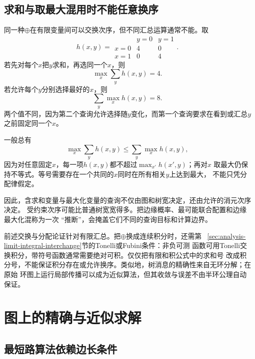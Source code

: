 \subsection{求和与取最大混用时不能任意换序}

同一种\(\oplus\)在有限变量间可以交换次序，但不同汇总运算通常不能。取
\[
  h(x,y)=
  \begin{array}{c|cc}
    &y=0&y=1\\ \hline
    x=0&4&0\\
    x=1&0&4
  \end{array}.
\]
若先对每个\(x\)把\(y\)求和，再选同一个\(x\)，则
\begin{equation}
  \max_x\sum_y h(x,y)=4.
  \label{eq:graph-theory-max-sum-order-a}
\end{equation}
若允许每个\(y\)分别选择最好的\(x\)，则
\begin{equation}
  \sum_y\max_x h(x,y)=8.
  \label{eq:graph-theory-max-sum-order-b}
\end{equation}
两个值不同，因为第二个查询允许选择随\(y\)变化，而第一个查询要求在看到或汇总\(y\)
之前固定同一个\(x\)。

一般总有
\[
  \max_x\sum_y h(x,y)\leq\sum_y\max_x h(x,y),
\]
因为对任意固定\(x\)，每一项\(h(x,y)\)都不超过\(\max_{x'}h(x',y)\)；再对\(x\)
取最大仍保持不等式。等号需要存在一个共同的\(x\)同时在所有相关\(y\)上达到最大，
不能只凭分配律假定。

因此，含求和变量与最大化变量的查询不仅由图和树宽决定，还由允许的消元次序决定。
受约束次序可能比普通树宽宽得多。把边缘概率、最可能联合配置和边缘最大化混称为一次
“推断”，会掩盖它们不同的查询目标和计算边界。

前述交换与分配论证针对有限汇总。把\(\oplus\)换成连续积分时，还需第
~\ref{sec:analysis-limit-integral-interchange}节的Tonelli或Fubini条件：非负可测
函数可用Tonelli交换积分，带符号函数通常需要绝对可积。仅仅把有限和积公式中的求和号
改成积分号，不能保证积分存在或允许换序。类似地，树消息的精确性来自无环分解；在原始
环图上运行局部传播可以成为近似算法，但其收敛与误差不由半环公理自动保证。

\section{图上的精确与近似求解}
\label{sec:graph-theory-exact-approximate-algorithms}

\subsection{最短路算法依赖边长条件}

